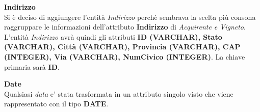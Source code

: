 \textbf{\large{Indirizzo}}\\
Si è deciso di aggiungere l'entità \emph{Indirizzo} perchè sembrava la scelta più consona raggruppare le informazioni dell'attributo \textbf{Indirizzo} di \emph{Acquirente e Vigneto}. L'entità \emph{Indirizzo} avrà quindi gli attributi \textbf{ID (VARCHAR), Stato (VARCHAR), Città (VARCHAR), Provincia (VARCHAR), CAP (INTEGER), Via (VARCHAR), NumCivico (INTEGER)}. La chiave primaria sarà \textbf{ID}.

\begin{flushleft}
\textbf{\large{Date}}\\
Qualsiasi \emph{data} e' stata trasformata in un attributo singolo visto che viene rappresentato con il tipo \textbf{DATE}.
\end{flushleft}

